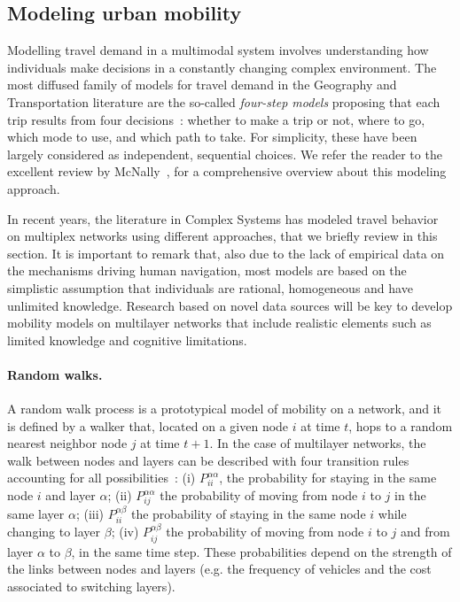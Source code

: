 \subsection{Modeling urban mobility \label{mobility_1}}
Modelling travel demand in a multimodal system involves understanding how individuals make decisions in a constantly changing complex environment. The most diffused family of models for travel demand in the Geography and Transportation literature are the so-called \emph{four-step models} proposing that each trip results from four decisions~\cite{mcnally2000four}: whether to make a trip or not, where to go, which mode to use, and which path to take. For simplicity, these have been largely considered as independent, sequential choices. We refer the reader to the excellent review by McNally~\cite{mcnally2000four}, for a comprehensive overview about this modeling approach.

In recent years, the literature in Complex Systems has modeled travel behavior on multiplex networks using different approaches, that we briefly review in this section. It is important to remark that, also due to the lack of empirical data on the mechanisms driving human navigation, most models are based on the simplistic assumption that individuals are rational, homogeneous and have unlimited knowledge. Research based on novel data sources will be key to develop mobility models on multilayer networks that include realistic elements such as limited knowledge and cognitive limitations.

\paragraph{Random walks.}
A random walk process is a prototypical model of mobility on a network, and it is defined by a walker that, located on a given node $i$ at time $t$, hops to a random nearest neighbor node $j$ at time $t + 1$. In the case of multilayer networks, the walk between nodes and layers can be described with four transition rules accounting for all possibilities~\cite{dedomenico2014interconnected}: (i) $P_{ii}^{\alpha\alpha}$, the probability for staying in the same node $i$ and layer $\alpha$; (ii) $P_{ij}^{\alpha\alpha}$ the probability of moving from node $i$ to $j$ in the same layer $\alpha$; (iii) $P_{ii}^{\alpha\beta}$ the probability of staying in the same node $i$ while changing to layer $\beta$; (iv) $P_{ij}^{\alpha\beta}$ the probability of moving from node $i$ to $j$ and from layer $\alpha$ to $\beta$, in the same time step. These probabilities depend on the strength of the links between nodes and layers (e.g. the frequency of vehicles and the cost associated to switching layers). 

